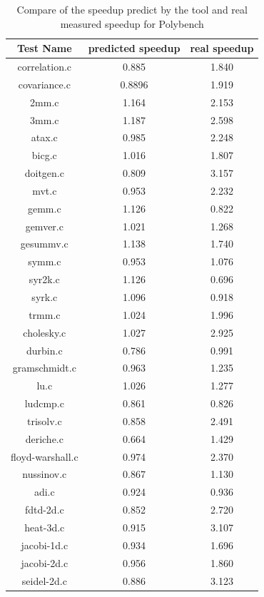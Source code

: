\begin{table}
\begin{center}
\caption{Compare of the speedup predict by the tool and real measured speedup for Polybench}
\vspace{0.2cm}
\begin{tabular}{ |c|c|c| } 
 \hline
Test Name & predicted speedup & real speedup \\
 \hline
 correlation.c & 0.885 & 1.840 \\
 \hline
  covariance.c & 0.8896 & 1.919 \\
 \hline
  2mm.c & 1.164 & 2.153 \\
 \hline
  3mm.c & 1.187 & 2.598 \\
 \hline
  atax.c & 0.985 & 2.248 \\
 \hline
  bicg.c & 1.016 & 1.807 \\
 \hline
  doitgen.c & 0.809 & 3.157 \\
 \hline
  mvt.c & 0.953 & 2.232 \\
 \hline
  gemm.c & 1.126 & 0.822\\
 \hline
  gemver.c & 1.021 & 1.268 \\
 \hline
  gesummv.c & 1.138 & 1.740 \\
 \hline
  symm.c & 0.953 & 1.076 \\
 \hline
  syr2k.c & 1.126 & 0.696 \\
 \hline
  syrk.c & 1.096 & 0.918 \\
 \hline
  trmm.c & 1.024 & 1.996 \\
 \hline
  cholesky.c & 1.027 & 2.925 \\
 \hline
  durbin.c & 0.786 & 0.991 \\
 \hline
  gramschmidt.c & 0.963 & 1.235 \\
 \hline
  lu.c & 1.026 & 1.277 \\
 \hline
  ludcmp.c & 0.861 & 0.826 \\
 \hline
  trisolv.c & 0.858 & 2.491 \\
 \hline
  deriche.c & 0.664 & 1.429 \\
 \hline
  floyd-warshall.c & 0.974 & 2.370 \\
 \hline
  nussinov.c & 0.867 & 1.130 \\
 \hline
  adi.c & 0.924 & 0.936 \\
 \hline
  fdtd-2d.c & 0.852 & 2.720 \\
 \hline
  heat-3d.c & 0.915 & 3.107 \\
 \hline
  jacobi-1d.c & 0.934 & 1.696 \\
 \hline
  jacobi-2d.c & 0.956 & 1.860 \\
 \hline
  seidel-2d.c & 0.886 & 3.123 \\
 \hline
\end{tabular}
\end{center}
\end{table}
\newpage


